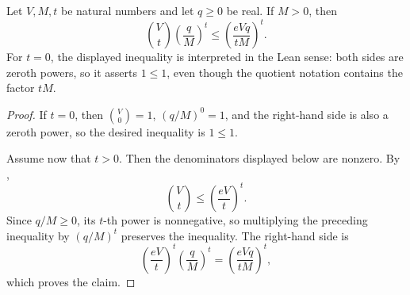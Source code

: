 \begin{lemma}
Let \(V,M,t\) be natural numbers and let \(q\ge 0\) be real.  If \(M>0\), then
\[
  \binom Vt \left(\frac{q}{M}\right)^t
  \le
  \left(\frac{eVq}{tM}\right)^t .
\]
For \(t=0\), the displayed inequality is interpreted in the Lean sense: both
sides are zeroth powers, so it asserts \(1\le 1\), even though the quotient
notation contains the factor \(tM\).
\end{lemma}
\begin{proof}
If \(t=0\), then \(\binom V0=1\), \((q/M)^0=1\), and the right-hand side is
also a zeroth power, so the desired inequality is \(1\le 1\).

Assume now that \(t>0\).  Then the denominators displayed below are nonzero.
By ,
\[
  \binom Vt \le \left(\frac{eV}{t}\right)^t .
\]
Since \(q/M\ge 0\), its \(t\)-th power is nonnegative, so multiplying the
preceding inequality by \((q/M)^t\) preserves the inequality.  The right-hand
side is
\[
  \left(\frac{eV}{t}\right)^t \left(\frac{q}{M}\right)^t
  =
  \left(\frac{eVq}{tM}\right)^t ,
\]
which proves the claim.
\end{proof}
